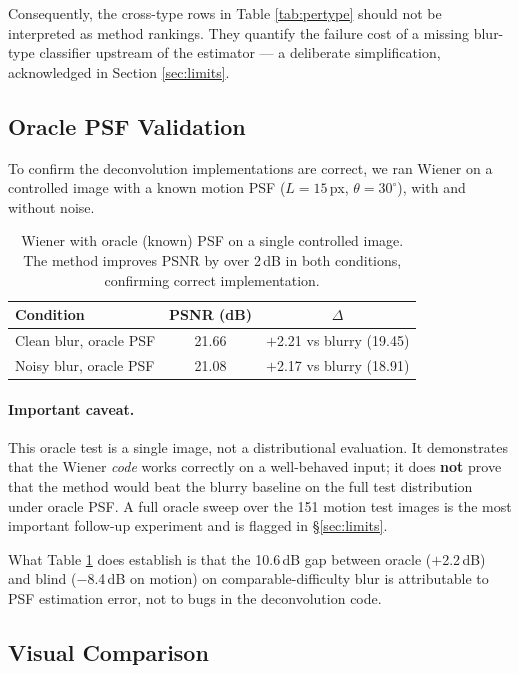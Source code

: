\documentclass[12pt,a4paper]{article}
\providecommand{\degree}{^{\circ}}
\begin{document}
Consequently, the cross-type rows in Table \ref{tab:pertype} should not
be interpreted as method rankings. They quantify the failure cost of a
missing blur-type classifier upstream of the estimator --- a
deliberate simplification, acknowledged in Section \ref{sec:limits}.

\subsection{Oracle PSF Validation}
\label{sec:oracle}

To confirm the deconvolution implementations are correct, we ran Wiener
on a controlled image with a known motion PSF ($L=15$\,px,
$\theta=30\degree$), with and without noise.

\begin{table}[H]
\centering
\begin{tabular}{lcc}
\toprule
\textbf{Condition} & \textbf{PSNR (dB)} & \textbf{$\Delta$} \\
\midrule
Clean blur, oracle PSF   & 21.66 & $+$2.21 vs blurry (19.45) \\
Noisy blur, oracle PSF   & 21.08 & $+$2.17 vs blurry (18.91) \\
\bottomrule
\end{tabular}
\caption{Wiener with oracle (known) PSF on a single controlled image. The method improves PSNR by over 2\,dB in both conditions, confirming correct implementation.}
\label{tab:oracle}
\end{table}

\paragraph{Important caveat.} This oracle test is a single image, not a
distributional evaluation. It demonstrates that the Wiener
\textit{code} works correctly on a well-behaved input; it does \textbf{not}
prove that the method would beat the blurry baseline on the full test
distribution under oracle PSF. A full oracle sweep over the 151 motion
test images is the most important follow-up experiment and is flagged
in \S\ref{sec:limits}.

What Table \ref{tab:oracle} does establish is that the 10.6\,dB gap
between oracle ($+$2.2\,dB) and blind ($-$8.4\,dB on motion) on
comparable-difficulty blur is attributable to PSF estimation error, not
to bugs in the deconvolution code.

\subsection{Visual Comparison}
\end{document}
